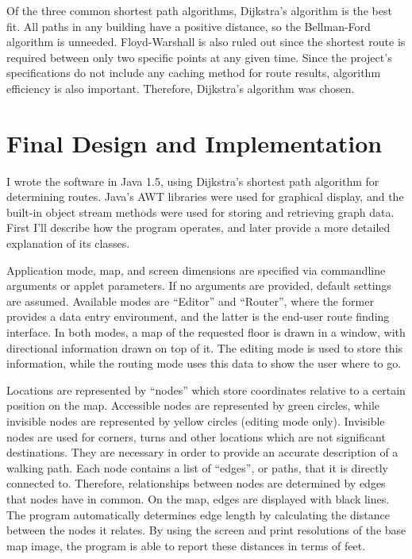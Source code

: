 \documentclass[12pt,letterpaper,titlepage]{article}   %
\begin{document}
Of the three common shortest path algorithms, Dijkstra's algorithm is
the best fit. All paths in any building have a positive distance, so the
Bellman-Ford algorithm is unneeded. Floyd-Warshall is also ruled out
since the shortest route is required between only two specific points at
any given time. Since the project's specifications do not include any
caching method for route results, algorithm efficiency is also
important. Therefore, Dijkstra's algorithm was chosen. \cite{skiena}


\section{Final Design and Implementation}

I wrote the software in Java 1.5, using Dijkstra's shortest path
algorithm for determining routes. Java's AWT libraries were used for
graphical display, and the built-in object stream methods were used for
storing and retrieving graph data. First I'll describe how the program
operates, and later provide a more detailed explanation of its classes.

Application mode, map, and screen dimensions are specified via
commandline arguments or applet parameters. If no arguments are
provided, default settings are assumed. Available modes are ``Editor''
and ``Router'', where the former provides a data entry environment, and
the latter is the end-user route finding interface. In both modes, a map
of the requested floor is drawn in a window, with directional
information drawn on top of it. The editing mode is used to store this
information, while the routing mode uses this data to show the user
where to go. 

Locations are represented by ``nodes'' which store coordinates relative
to a certain position on the map. Accessible nodes are represented by
green circles, while invisible nodes are represented by yellow circles
(editing mode only). Invisible nodes are used for corners, turns and
other locations which are not significant destinations. They are
necessary in order to provide an accurate description of a walking path.
Each node contains a list of ``edges'', or paths, that it is directly
connected to. Therefore, relationships between nodes are determined by
edges that nodes have in common. On the map, edges are displayed with
black lines. The program automatically determines edge length by
calculating the distance between the nodes it relates. By using the
screen and print resolutions of the base map image, the program is able
to report these distances in terms of feet.
\end{document}
